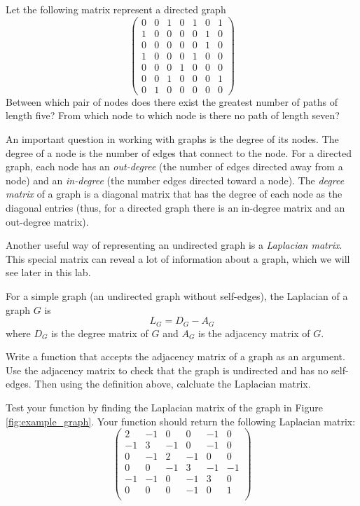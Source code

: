 \begin{problem}
Let the following matrix represent a directed graph
\[
\begin{pmatrix}
0 & 0 & 1 & 0 & 1 & 0 & 1 \\
1 & 0 & 0 & 0 & 0 & 1 & 0 \\
0 & 0 & 0 & 0 & 0 & 1 & 0 \\
1 & 0 & 0 & 0 & 1 & 0 & 0 \\
0 & 0 & 0 & 1 & 0 & 0 & 0 \\
0 & 0 & 1 & 0 & 0 & 0 & 1 \\
0 & 1 & 0 & 0 & 0 & 0 & 0
\end{pmatrix}
\]
Between which pair of nodes does there exist the greatest number of paths
of length five?
From which node to which node is there no path of length seven?
\end{problem}

An important question in working with graphs is the degree of its nodes.
The degree of a node is the number of edges that connect to the node.
For a directed graph, each node has an \emph{out-degree} (the number of edges directed away from a node) and an \emph{in-degree} (the number edges directed toward a node).
The \emph{degree matrix} of a graph is a diagonal matrix that has the degree of each node as the diagonal entries (thus, for a directed graph there is an in-degree matrix and an out-degree matrix).

Another useful way of representing an undirected graph is a \emph{Laplacian matrix}.
This special matrix can reveal a lot of information about a graph, which we will see later in this lab.
\begin{definition}
For a simple graph (an undirected graph without self-edges), the Laplacian of a graph $G$ is
\[ L_G = D_G - A_G \]
where $D_G$ is the degree matrix of $G$ and $A_G$ is the adjacency matrix of $G$.
\end{definition}


\begin{problem}
Write a function that accepts the adjacency matrix of a graph as an argument. Use the adjacency matrix to check that the graph is undirected and has no self-edges. Then using the definition above, calcluate the Laplacian matrix.

Test your function by finding the Laplacian matrix of the graph in Figure \ref{fig:example_graph}. Your function should return the following Laplacian matrix:
\[
\begin{pmatrix}
2 &-1 & 0 & 0 &-1 & 0 \\
-1 & 3 &-1 & 0 &-1 & 0 \\
0 &-1 & 2 &-1 & 0 & 0 \\
0 & 0 &-1 & 3 &-1 &-1 \\
-1 &-1 & 0 &-1 & 3 & 0 \\
0 & 0 & 0 &-1 & 0 & 1 \\
\end{pmatrix}
\]
\label{prob:laplacian}
\end{problem}


